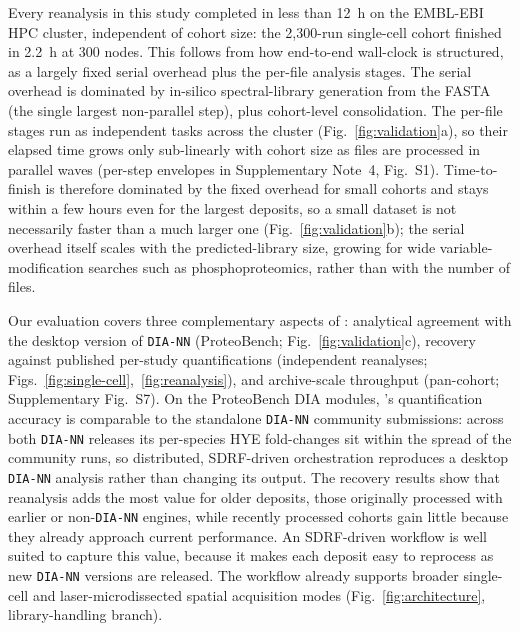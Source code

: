 \documentclass[preprint,12pt]{elsarticle}
\begin{document}
Every reanalysis in this study completed in less than 12~h on the EMBL-EBI HPC cluster, independent of cohort size: the 2{,}300-run single-cell cohort finished in 2.2~h at 300 nodes. This follows from how end-to-end wall-clock is structured, as a largely fixed serial overhead plus the per-file analysis stages. The serial overhead is dominated by in-silico spectral-library generation from the FASTA (the single largest non-parallel step), plus cohort-level consolidation. The per-file stages run as independent tasks across the cluster (Fig.~\ref{fig:validation}a), so their elapsed time grows only sub-linearly with cohort size as files are processed in parallel waves (per-step envelopes in Supplementary Note~4, Fig.~S1). Time-to-finish is therefore dominated by the fixed overhead for small cohorts and stays within a few hours even for the largest deposits, so a small dataset is not necessarily faster than a much larger one (Fig.~\ref{fig:validation}b); the serial overhead itself scales with the predicted-library size, growing for wide variable-modification searches such as phosphoproteomics, rather than with the number of files.

Our evaluation covers three complementary aspects of \quantmsdiann{}: analytical agreement with the desktop version of \texttt{DIA-NN} (ProteoBench; Fig.~\ref{fig:validation}c), recovery against published per-study quantifications (independent reanalyses; Figs.~\ref{fig:single-cell},~\ref{fig:reanalysis}), and archive-scale throughput (pan-cohort; Supplementary Fig.~S7). On the ProteoBench DIA modules, \quantmsdiann{}'s quantification accuracy is comparable to the standalone \texttt{DIA-NN} community submissions: across both \texttt{DIA-NN} releases its per-species HYE fold-changes sit within the spread of the community runs, so distributed, SDRF-driven orchestration reproduces a desktop \texttt{DIA-NN} analysis rather than changing its output. The recovery results show that reanalysis adds the most value for older deposits, those originally processed with earlier or non-\texttt{DIA-NN} engines, while recently processed cohorts gain little because they already approach current performance. An SDRF-driven workflow is well suited to capture this value, because it makes each deposit easy to reprocess as new \texttt{DIA-NN} versions are released. The workflow already supports broader single-cell and laser-microdissected spatial acquisition modes (Fig.~\ref{fig:architecture}, library-handling branch).
\end{document}
